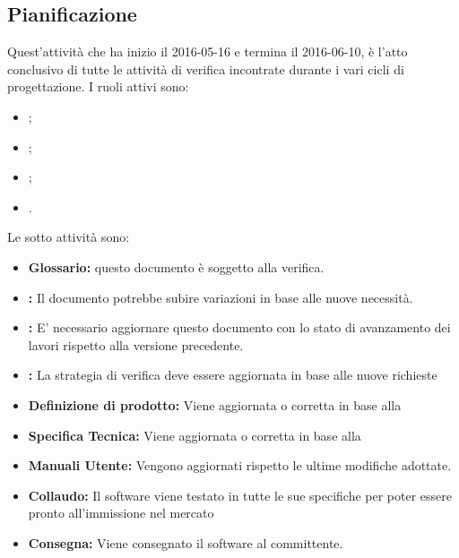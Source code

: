 \documentclass[12pt,a4paper]{article}
\begin{document}
\subsection{Pianificazione}
Quest'attività che ha inizio il 2016-05-16 e termina il 2016-06-10, è l'atto conclusivo di tutte le attività di verifica incontrate durante i vari cicli di progettazione. I ruoli attivi sono:
\begin{itemize}
	\item \PM;
	\item \AM;
	\item \PG;
	\item \VR.
\end{itemize}
Le sotto attività sono:
\begin{itemize}
	\item \textbf{Glossario:} 
	questo documento è soggetto alla verifica.
	\item \textbf{\NdP:}
	Il documento potrebbe subire variazioni in base
	alle nuove necessità.
	\item \textbf{\PdP:}
	E' necessario aggiornare questo documento con lo stato di avanzamento
	dei lavori rispetto alla versione precedente.
	\item \textbf{\PdQ:}
	La strategia di verifica deve essere aggiornata in base 
	alle nuove richieste
	\item \textbf{Definizione di prodotto:}
	Viene aggiornata o corretta in base alla \RQ
	\item \textbf{Specifica Tecnica:}
	Viene aggiornata o corretta in base alla \RQ
	\item \textbf{Manuali Utente:}
	Vengono aggiornati rispetto le ultime modifiche adottate.
	\item \textbf{Collaudo:}
	Il software viene testato in tutte le sue specifiche per poter essere pronto all'immissione nel mercato
	\item \textbf{Consegna:}
	Viene consegnato il software al committente.
\end{itemize}

\newpage
\end{document}
